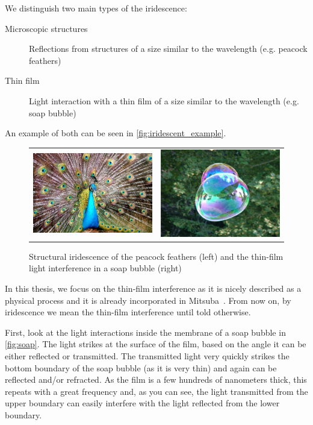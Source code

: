 We distinguish two main types of the iridescence:

\begin{description}
	\item[Microscopic structures] Reflections from structures of a size similar to the wavelength (e.g. peacock feathers)
	\item[Thin film] Light interaction with a thin film of a size similar to the wavelength (e.g. soap bubble)
\end{description}

An example of both can be seen in \autoref{fig:iridescent_example}.

\begin{figure}
	\centering
	\begin{tabular}{cc}
		\includegraphics[width=0.4\linewidth]{img/iridescent_peacock.jpg}
		&
		\includegraphics[width=0.4\linewidth]{img/iridescent_soap.jpg}
	\end{tabular}
	\caption[Irid example]{Structural iridescence of the peacock feathers (left) and the thin-film light interference in a soap bubble (right)\footnotemark}
	\label{fig:iridescent_example}
\end{figure}

In this thesis, we focus on the thin-film interference as it is nicely described as a physical process and it is already incorporated in Mitsuba~\cite{belcour2017practical}. From now on, by iridescence we mean the thin-film interference until told otherwise.

First, look at the light interactions inside the membrane of a soap bubble in \autoref{fig:soap}. The light strikes at the surface of the film, based on the angle it can be either reflected or transmitted. The transmitted light very quickly strikes the bottom boundary of the soap bubble (as it is very thin) and again can be reflected and/or refracted. As the film is a few hundreds of nanometers thick, this repeats with a great frequency and, as you can see, the light transmitted from the upper boundary can easily interfere with the light reflected from the lower boundary.

